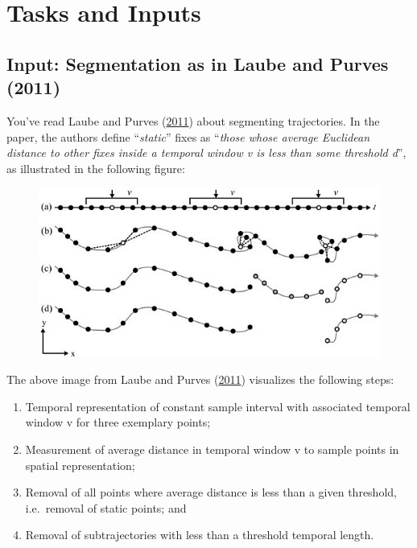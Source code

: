 \documentclass[]{book}
\providecommand{\tightlist}{%
  \setlength{\itemsep}{0pt}\setlength{\parskip}{0pt}}
\begin{document}
\section{Tasks and Inputs}\label{tasks-and-inputs-2}

\subsection{Input: Segmentation as in Laube and Purves
(2011)}\label{input-segmentation-as-in-laube-and-purves-2011}

You've read Laube and Purves (\protect\hyperlink{ref-laube2011}{2011})
about segmenting trajectories. In the paper, the authors define
``\emph{static}'' fixes as ``\emph{those whose average Euclidean
distance to other fixes inside a temporal window v is less than some
threshold d}'', as illustrated in the following figure:

\begin{figure}
\centering
\includegraphics{02_Images/laube_2011.jpg}
\caption{}
\end{figure}

The above image from Laube and Purves
(\protect\hyperlink{ref-laube2011}{2011}) visualizes the following
steps:

\begin{enumerate}
\def\labelenumi{(\alph{enumi})}
\tightlist
\item
  Temporal representation of constant sample interval with associated
  temporal window v for three exemplary points;
\item
  Measurement of average distance in temporal window v to sample points
  in spatial representation;
\item
  Removal of all points where average distance is less than a given
  threshold, i.e.~removal of static points; and
\item
  Removal of subtrajectories with less than a threshold temporal length.
\end{enumerate}
\end{document}
